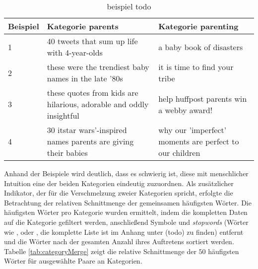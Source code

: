 \documentclass[a4paper,11pt]{article}
\begin{document}
\begin{table}[ht]
\begin{center}
\begin{tabular}{ | p{} | p{}| p{} | }
  \hline
Beispiel & Kategorie parents  & Kategorie parenting \\ 
  \hline
1 & 40 tweets that sum up life with 4-year-olds & a baby book of disasters \\ 
  2 & these were the trendiest baby names in the late '80s & it is time to find your tribe \\ 
  3 & these quotes from kids are hilarious, adorable and oddly insightful & help huffpost parents win a webby award! \\ 
  4 & 30  itstar wars'-inspired names parents are giving their babies & why our 'imperfect' moments are perfect to our children \\ 
   \hline
\end{tabular}
\label{tab:parentsMerge}
\caption{beispiel todo}
\end{center}
\end{table}

Anhand der Beispiele wird deutlich, dass es schwierig ist, diese mit menschlicher Intuition eine der beiden Kategorien eindeutig zuzuordnen. Als zusätzlicher Indikator, der für die Verschmelzung zweier Kategorien spricht, erfolgte die Betrachtung der relativen Schnittmenge der gemeinsamen häufigsten Wörter. Die häufigsten Wörter pro Kategorie wurden ermittelt, indem die kompletten Daten auf die Kategorie gefiltert werden, anschließend Symbole und \textit{stopwords} (Wörter wie ,  oder , die komplette Liste ist im Anhang unter (todo) zu finden) entfernt und die Wörter nach der gesamten Anzahl ihres Auftretens sortiert werden. Tabelle \ref{tab:categoryMerge} zeigt die relative Schnittmenge der $50$ häufigsten Wörter für ausgewählte Paare an Kategorien.
\end{document}
